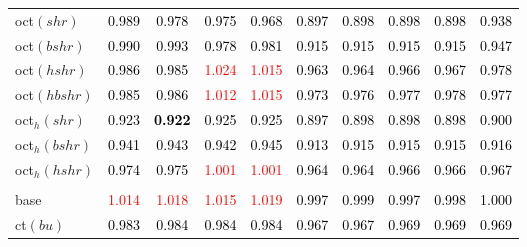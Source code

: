 \begin{tabular}[t]{l|ccccccccc}
oct$(shr)$ & \textcolor{black}{0.989} & \textcolor{black}{0.978} & \textcolor{black}{0.975} & \textcolor{black}{0.968} & \textcolor{black}{0.897} & \textcolor{black}{0.898} & \textcolor{black}{0.898} & \textcolor{black}{0.898} & \textcolor{black}{0.938}\\
oct$(bshr)$ & \textcolor{black}{0.990} & \textcolor{black}{0.993} & \textcolor{black}{0.978} & \textcolor{black}{0.981} & \textcolor{black}{0.915} & \textcolor{black}{0.915} & \textcolor{black}{0.915} & \textcolor{black}{0.915} & \textcolor{black}{0.947}\\
oct$(hshr)$ & \textcolor{black}{0.986} & \textcolor{black}{0.985} & \textcolor{red}{1.024} & \textcolor{red}{1.015} & \textcolor{black}{0.963} & \textcolor{black}{0.964} & \textcolor{black}{0.966} & \textcolor{black}{0.967} & \textcolor{black}{0.978}\\
oct$(hbshr)$ & \textcolor{black}{0.985} & \textcolor{black}{0.986} & \textcolor{red}{1.012} & \textcolor{red}{1.015} & \textcolor{black}{0.973} & \textcolor{black}{0.976} & \textcolor{black}{0.977} & \textcolor{black}{0.978} & \textcolor{black}{0.977}\\
oct$_h(shr)$ & \textcolor{black}{0.923} & \textcolor{black}{\textbf{0.922}} & \textcolor{black}{0.925} & \textcolor{black}{0.925} & \textcolor{black}{0.897} & \textcolor{black}{0.898} & \textcolor{black}{0.898} & \textcolor{black}{0.898} & \textcolor{black}{0.900}\\
oct$_h(bshr)$ & \textcolor{black}{0.941} & \textcolor{black}{0.943} & \textcolor{black}{0.942} & \textcolor{black}{0.945} & \textcolor{black}{0.913} & \textcolor{black}{0.915} & \textcolor{black}{0.915} & \textcolor{black}{0.915} & \textcolor{black}{0.916}\\
oct$_h(hshr)$ & \textcolor{black}{0.974} & \textcolor{black}{0.975} & \textcolor{red}{1.001} & \textcolor{red}{1.001} & \textcolor{black}{0.964} & \textcolor{black}{0.964} & \textcolor{black}{0.966} & \textcolor{black}{0.966} & \textcolor{black}{0.967}\\
\addlinespace[0.3em]
\multicolumn{10}{c}{\textbf{$k = 1$}}\\
base & \textcolor{red}{1.014} & \textcolor{red}{1.018} & \textcolor{red}{1.015} & \textcolor{red}{1.019} & \textcolor{black}{0.997} & \textcolor{black}{0.999} & \textcolor{black}{0.997} & \textcolor{black}{0.998} & \textcolor{black}{1.000}\\
ct$(bu)$ & \textcolor{black}{0.983} & \textcolor{black}{0.984} & \textcolor{black}{0.984} & \textcolor{black}{0.984} & \textcolor{black}{0.967} & \textcolor{black}{0.967} & \textcolor{black}{0.969} & \textcolor{black}{0.969} & \textcolor{black}{0.969}\\

\end{tabular}
